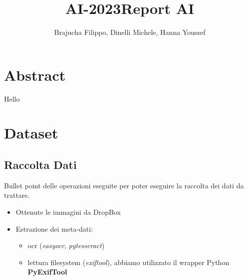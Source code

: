 \title{AI-2023}\documentclass[12pt,a4paper,twoside]{article}
\author{Brajucha Filippo, Dinelli Michele, Hanna Youssef}
\title{Report AI}
\begin{document}
\maketitle

\section*{Abstract}
Hello

\newpage

\tableofcontents

\newpage

\section{Dataset}

\subsection{Raccolta Dati}
Bullet point delle operazioni eseguite per poter eseguire la raccolta dei dati da trattare.
\begin{itemize}
    \item Ottenute le immagini da DropBox
    \item Estrazione dei meta-dati:
    \begin{itemize}
        \item ocr (\textit{easyocr}, \textit{pytesseract})
        \item lettura filesystem (\textit{exiftool}), abbiamo utilizzato il wrapper Python \textbf{PyExifTool}
    \end{itemize}
\end{itemize}
\end{document}

